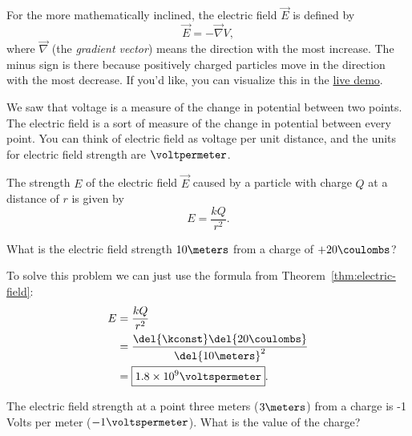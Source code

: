 \documentclass[12pt,paper=letter]{scrartcl}
\begin{document}
    \pnp
    For the more mathematically inclined, the electric field $\vec{E}$ is defined by
    \[
        \vec{E}=-\vec{\nabla}V,
    \]
    where $\vec{\nabla}$ (the \emph{gradient vector}) means the direction with the most increase.
    The minus sign is there because positively charged particles move in the direction with the most decrease.
    If you'd like, you can visualize this in the \href{https://www.geogebra.org/3d/mtunejmv}{live demo}.

    \pnp

    We saw that voltage is a measure of the change in potential between two points.
    The electric field is a sort of measure of the change in potential between every point.
    You can think of electric field as voltage per unit distance,
    and the units for electric field strength are $\voltpermeter$.

    \begin{thmboxed}
        \label{thm:electric-field}
        The strength $E$ of the electric field $\vec{E}$ caused by a particle with charge $Q$ at a distance of $r$ is given by
        \begin{equation}
            \label{eq:electric-field}
            E=\frac{kQ}{r^2}.
        \end{equation}
    \end{thmboxed}
    \begin{exboxed}
        \label{ex:electric_field1}
        What is the electric field strength $10 \meters$ from a charge of $+20\coulombs$?
    \end{exboxed}

    To solve this problem we can just use the formula from Theorem~\ref{thm:electric-field}:
    \begin{align*}
        E&=\frac{kQ}{r^2}\\
        &=\frac{\del{\kconst}\del{20 \coulombs}}{\del{10 \meters}^2}\\
        &=\boxed{1.8\times 10^{9}\voltspermeter}.
    \end{align*}

    \begin{exboxed}
        The electric field strength at a point three meters ($3\meters$) from a charge is -1 Volts per meter ($-1\voltspermeter$).
        What is the value of the charge?
    \end{exboxed}
\end{document}

